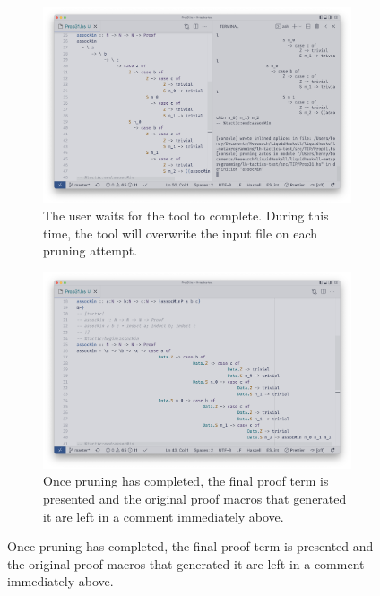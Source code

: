 \begin{figure}
\begin{subfigure}[t][][t]{1\textwidth}
\begin{minipage}[c]{0.49\textwidth}
    \end{minipage}
  \end{subfigure}
  \begin{subfigure}[t][][t]{1\textwidth}
    \begin{minipage}[c]{0.5\textwidth}
      \caption{The user waits for the  tool to complete. During
      this time, the tool will overwrite the input file on each pruning attempt.}
    \end{minipage}
    \hfill
    \begin{minipage}[c]{0.49\textwidth}
      \includegraphics[width=\textwidth]{example-screenshots/pruning.png}
    \end{minipage}
  \end{subfigure}
  \begin{subfigure}[t][][t]{1\textwidth}
    \begin{minipage}[c]{0.5\textwidth}
      \caption{Once pruning has completed, the final proof term is presented and
      the original proof macros that generated it are left in a comment 
      immediately above.}    \end{minipage}
    \hfill
    \begin{minipage}[c]{0.49\textwidth}
      \includegraphics[width=\textwidth]{example-screenshots/done.png}

\end{minipage}
\end{subfigure}
\end{figure}
